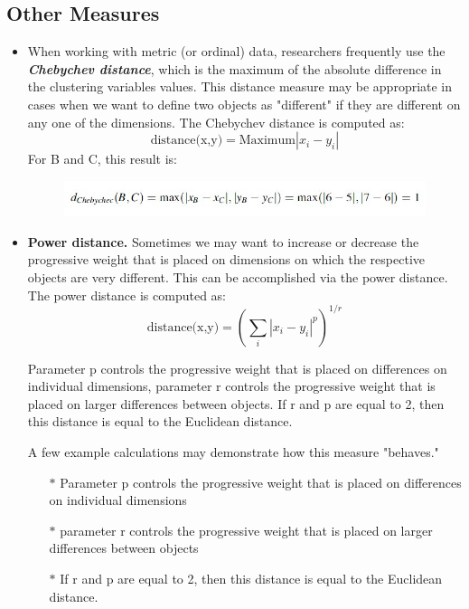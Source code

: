\documentclass[a4paper,12pt]{report}
\begin{document}



\subsection{Other Measures}
\begin{itemize}
\item When working with metric (or ordinal) data, researchers frequently use
the \textbf{\textit{Chebychev distance}}, which is the maximum of the absolute difference in the
clustering variables values. This distance measure may be appropriate in cases when we want to define two objects as "different" if they are different on any one of the dimensions. The Chebychev distance is computed as:
\[\mbox{distance(x,y)} = \mbox{Maximum}|x_i - y_i|\] For B and C, this result is:

\begin{figure}[h!]
	\begin{center}
		\includegraphics[scale=0.6]{images/Chebyshev.jpg}\\
	\end{center}
\end{figure}


\item \textbf{Power distance.} Sometimes we may want to increase or decrease the progressive weight that is placed on dimensions on which the respective objects are very different. This can be accomplished via the power distance. The power distance is computed as:
\[\mbox{distance(x,y)}  = (\sum_i |x_i - y_i|^p)^{1/r}\]

Parameter p controls the progressive weight that is placed on differences on individual dimensions, parameter r controls the progressive weight that is placed on larger differences between objects. If r and p are equal to 2, then this distance is equal to the Euclidean distance.

A few example calculations may demonstrate how this measure "behaves." 
\begin{itemize}
\item[$\ast$] Parameter p controls the progressive weight that is placed on differences on individual dimensions
\item[$\ast$] parameter r controls the progressive weight that is placed on larger differences between objects
\item[$\ast$] If r and p are equal to 2, then this distance is equal to the Euclidean distance.
\end{itemize}


\end{itemize}
\end{document}
